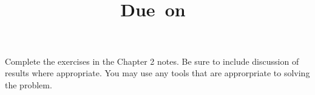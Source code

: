 \documentclass{article}
\title{
\vspace{2in}
\textmd{\textbf{\hmwkClass\ \hmwkTitle}}\\
\normalsize\vspace{0.1in}\small{Due\ on\ \hmwkDueDate}\\
\vspace{0.1in}\large{\textit{\hmwkClassInstructor}}
\vspace{3in}
}
\author{\textbf{\hmwkAuthorName}}
\date{} %
\begin{document}
\maketitle



\newpage
\tableofcontents
\newpage

Complete the exercises in the Chapter 2 notes. Be sure to include discussion of results
where appropriate. You may use any tools that are approrpriate to solving the problem.


\end{document}
